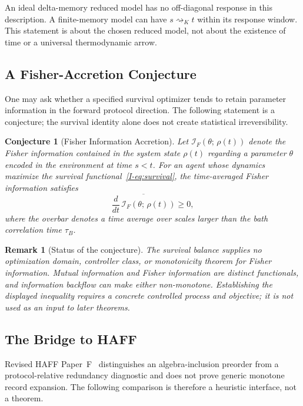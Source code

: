 \documentclass[12pt,a4paper,openany]{book}
\newtheorem{remark}[theorem]{Remark}
\newtheorem{conjecture}[theorem]{Conjecture}
\begin{document}
An ideal delta-memory reduced model has no off-diagonal response in this
description.  A finite-memory model can have
$s\rightsquigarrow_K t$ within its response window.  This statement is
about the chosen reduced model, not about the existence of time or a
universal thermodynamic arrow.

\subsection{A Fisher-Accretion Conjecture}

One may ask whether a specified survival optimizer tends to retain
parameter information in the forward protocol direction.  The following
statement is a conjecture; the survival identity alone does not create
statistical irreversibility.

\begin{conjecture}[Fisher Information Accretion]
\label{I-prop:fisher_accretion}
Let $\mathcal{I}_F(\theta;\, \rho(t))$ denote the Fisher
information contained in the system state $\rho(t)$ regarding
a parameter $\theta$ encoded in the environment at time $s < t$.
For an agent whose dynamics maximize the survival
functional~\eqref{I-eq:survival}, the time-averaged Fisher
information satisfies
\begin{equation}
\label{I-eq:fisher_accretion}
\overline{\frac{d}{dt}\,
\mathcal{I}_F(\theta;\, \rho(t))} \geq 0,
\end{equation}
where the overbar denotes a time average over scales larger
than the bath correlation time $\tau_B$.
\end{conjecture}

\begin{remark}[Status of the conjecture]
The survival balance supplies no optimization domain, controller class,
or monotonicity theorem for Fisher information.  Mutual information and
Fisher information are distinct functionals, and information backflow
can make either non-monotone.  Establishing the displayed inequality
requires a concrete controlled process and objective; it is not used as
an input to later theorems.
\end{remark}

\subsection{The Bridge to HAFF}

Revised HAFF Paper~F~\cite{Liu2026HAFF_F} distinguishes an
algebra-inclusion preorder from a protocol-relative redundancy
diagnostic and does not prove generic monotone record expansion.  The
following comparison is therefore a heuristic interface, not a theorem.
\end{document}
